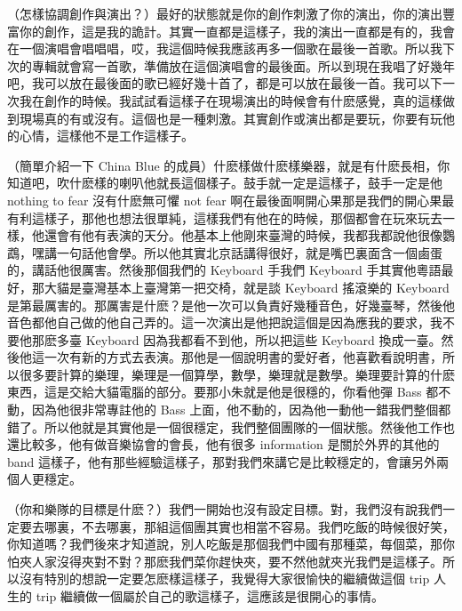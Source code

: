 \documentclass[UTF8,a4paper,oneside,twocolumn,12pt]{ctexbook}
\begin{document}
（怎樣協調創作與演出？）最好的狀態就是你的創作刺激了你的演出，你的演出豐富你的創作，這是我的詭計。其實一直都是這樣子，我的演出一直都是有的，我會在一個演唱會唱唱唱，哎，我這個時候我應該再多一個歌在最後一首歌。所以我下次的專輯就會寫一首歌，準備放在這個演唱會的最後面。所以到現在我唱了好幾年吧，我可以放在最後面的歌已經好幾十首了，都是可以放在最後一首。我可以下一次我在創作的時候。我試試看這樣子在現場演出的時候會有什麽感覺，真的這樣做到現場真的有或沒有。這個也是一種刺激。其實創作或演出都是要玩，你要有玩他的心情，這樣他不是工作這樣子。

（簡單介紹一下 China Blue 的成員）什麽樣做什麽樣樂器，就是有什麽長相，你知道吧，吹什麽樣的喇叭他就長這個樣子。鼓手就一定是這樣子，鼓手一定是他 nothing to fear 沒有什麽無可懼 not fear 啊在最後面啊開心果那是我們的開心果最有利這樣子，那他也想法很單純，這樣我們有他在的時候，那個都會在玩來玩去一樣，他還會有他有表演的天分。他基本上他剛來臺灣的時候，我都我都說他很像鸚鵡，嘿講一句話他會學。所以他其實北京話講得很好，就是嘴巴裏面含一個鹵蛋的，講話他很厲害。然後那個我們的 Keyboard 手我們 Keyboard 手其實他粵語最好，那大貓是臺灣基本上臺灣第一把交椅，就是談 Keyboard 搖滾樂的 Keyboard 是第最厲害的。那厲害是什麽？是他一次可以負責好幾種音色，好幾臺琴，然後他音色都他自己做的他自己弄的。這一次演出是他把說這個是因為應我的要求，我不要他那麽多臺 Keyboard 因為我都看不到他，所以把這些 Keyboard 換成一臺。然後他這一次有新的方式去表演。那他是一個說明書的愛好者，他喜歡看說明書，所以很多要計算的樂理，樂理是一個算學，數學，樂理就是數學。樂理要計算的什麽東西，這是交給大貓電腦的部分。要那小朱就是他是很穩的，你看他彈 Bass 都不動，因為他很非常專註他的 Bass 上面，他不動的，因為他一動他一錯我們整個都錯了。所以他就是其實他是一個很穩定，我們整個團隊的一個狀態。然後他工作也還比較多，他有做音樂協會的會長，他有很多 information 是關於外界的其他的 band 這樣子，他有那些經驗這樣子，那對我們來講它是比較穩定的，會讓另外兩個人更穩定。

（你和樂隊的目標是什麽？）我們一開始也沒有設定目標。對，我們沒有說我們一定要去哪裏，不去哪裏，那組這個團其實也相當不容易。我們吃飯的時候很好笑，你知道嗎？我們後來才知道說，別人吃飯是那個我們中國有那種菜，每個菜，那你怕夾人家沒得夾對不對？那麽我們菜你趕快夾，要不然他就夾光我們是這樣子。所以沒有特別的想說一定要怎麽樣這樣子，我覺得大家很愉快的繼續做這個 trip 人生的 trip 繼續做一個屬於自己的歌這樣子，這應該是很開心的事情。
\end{document}
